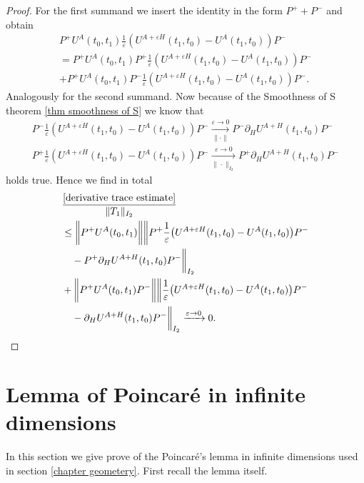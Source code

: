 \documentclass[b5paper,draft,openbib,12pt]{memoir}
\begin{document}
\begin{proof}
For the first summand we insert the identity in the 
form \(P^++P^-\) and obtain
\begin{align}
P^+ U^{A}(t_0,t_1) 
  \frac{1}{\varepsilon}\left(U^{A+\varepsilon H}(t_1,t_0)-U^{A}(t_1,t_0)\right)P^-\\
=P^+ U^{A}(t_0,t_1) P^+
\frac{1}{\varepsilon}\left(U^{A+\varepsilon H}(t_1,t_0)-U^{A}(t_1,t_0)\right)P^-\\
+P^+ U^{A}(t_0,t_1) P^-
\frac{1}{\varepsilon}\left(U^{A+\varepsilon H}(t_1,t_0)-U^{A}(t_1,t_0)\right)P^-.
\end{align}
Analogously for the second summand.
Now because of the Smoothness of S theorem 
\ref{thm smoothness of S}
we know that 
\begin{align}
  P^-
  \frac{1}{\varepsilon}\left(U^{A+\varepsilon H}(t_1,t_0)-U^{A}(t_1,t_0)\right)
  P^-\xrightarrow[\|\cdot\|]{\varepsilon\rightarrow 0} P^- \partial_H U^{A+H}(t_1,t_0)P^-\\
  P^+
  \frac{1}{\varepsilon}\left(U^{A+\varepsilon H}(t_1,t_0)-U^{A}(t_1,t_0)\right)
  P^-\xrightarrow[\|\cdot\|_{I_2}]{\varepsilon\rightarrow 0} P^+ \partial_H U^{A+H}(t_1,t_0)P^-
\end{align}
holds true. Hence we find in total 
\begin{align}
&\frac{\eqref{derivative trace estimate}}{\|T_1\|_{I_2}}\\
&\le \notag
\bigg\|  P^+ U^{A}(t_0,t_1)\bigg\| \bigg\| P^+
\frac{1}{\varepsilon}\big(U^{A+\varepsilon H}(t_1,t_0)-U^{A}(t_1,t_0)\big)P^- \\
&\quad- P^+\partial_{H}U^{A+H}(t_1,t_0)P^-\bigg\|_{I_2}\\
&+\bigg\|  P^+ U^{A}(t_0,t_1)P^- \bigg\| \bigg\|  \notag
\frac{1}{\varepsilon}\big(U^{A+\varepsilon H}(t_1,t_0)-U^{A}(t_1,t_0)\big)P^- \\
&\quad-\partial_{H}U^{A+H}(t_1,t_0)P^-\bigg\|_{I_2}\xrightarrow{\varepsilon \rightarrow 0} 0.
\end{align}

\end{proof}

\section{Lemma of Poincaré in infinite dimensions}\label{sec:proof of poincare}
In this section we give prove of the Poincaré's lemma 
in infinite dimensions used in section \ref{chapter geometery}.
First recall the lemma itself.
\end{document}

